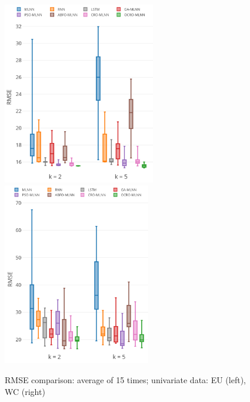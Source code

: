 \documentclass[11pt,twoside]{article}
\begin{document}
\begin{multicols}{2}
\begin{figure}
	\centering
	\begin{minipage}[h]{1\textwidth}
		\centering
		\includegraphics[width=0.45\textwidth =0cm 0cm 0cm 0cm, height = 8cm]{stability/st_eu_2.pdf}
		\centering
		\includegraphics[width=0.45\textwidth =0cm 0cm 0cm 0cm, height = 8cm]{stability/st_wc_2.pdf}
	\end{minipage}
	\caption{RMSE comparison: average of 15 times; univariate data: EU (left), WC (right)} 
	\label{fig:stability_uni}
\end{figure}


\end{multicols}
\end{document}
